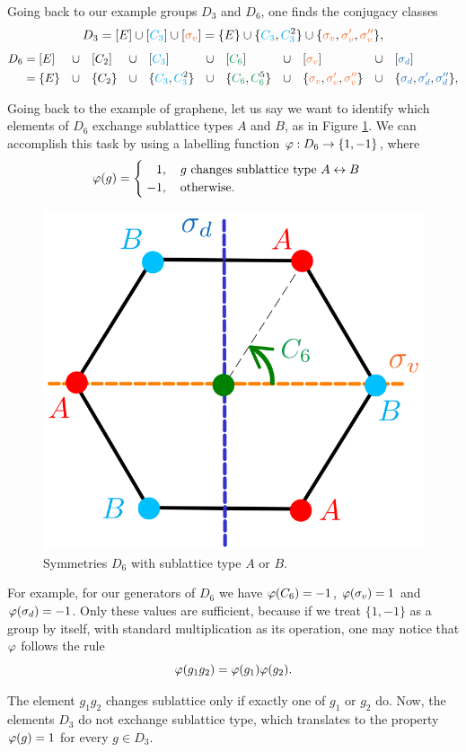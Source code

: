 Going back to our example groups $D_3$ and $D_6$, one finds the conjugacy classes
\begin{equation} \label{eq:D3_classes}
D_3 = [E] \cup [\Ct] \cup [\sv] = \{E\} \cup \{\Ct, \Ctn{2}\} \cup \{\sv, \svp, \svpp\},
\end{equation}
\begin{align*}
D_6 &= [E] &&\cup&& [C_2] &&\cup&& [\Ct] &&\cup&& [\Cs] &&\cup&& [\sv] &&\cup&& [\sd] \\
&= \{E\} &&\cup&& \{C_2\} &&\cup&& \{\Ct, \Ctn{2}\} &&\cup&& \{\Cs, \Csn{5}\} &&\cup&& \{\sv, \svp, \svpp\} &&\cup&& \{\sd, \sdp, \sdpp\},
\end{align*}

Going back to the example of graphene, let us say we want to identify which elements of $D_6$ exchange sublattice types $A$ and $B$, as in Figure \ref{fig:hexagon_AB}. We can accomplish this task by using a labelling function $\varphi: D_6 \to \{1, -1\}$, where
\begin{align*}
\vphi(g) =
\begin{cases}
\; \P1, \quad g \text{ changes sublattice type } A \leftrightarrow B \\
\; -1, \quad \text{otherwise.}
\end{cases}
\end{align*}

\begin{figure}[H]
\centering
\includegraphics[width=0.4\linewidth]{fig/hexagon_AB.png}
\caption{Symmetries $D_6$ with sublattice type $A$ or $B$.}
\label{fig:hexagon_AB}
\end{figure}

For example, for our generators of $D_6$ we have $\varphi(C_6) = -1$, $\varphi(\sigma_v) = 1$ and $\varphi(\sigma_d) = -1$. Only these values are sufficient, because if we treat $\{1, -1\}$ as a group by itself, with standard multiplication as its operation, one may notice that $\varphi$ follows the rule
$$
\varphi(g_1 g_2) = \varphi(g_1) \varphi(g_2).
$$

The element $g_1 g_2$ changes sublattice only if exactly one of $g_1$ or $g_2$ do. Now, the elements $D_3$ do not exchange sublattice type, which translates to the property $\varphi(g) = 1$ for every $g \in D_3$.

